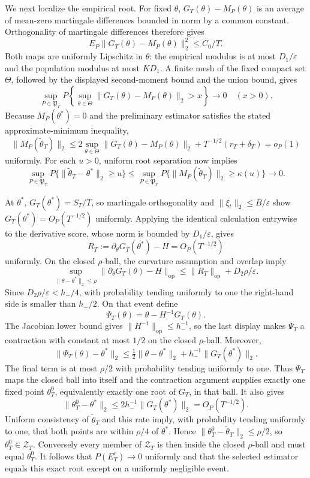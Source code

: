 We next localize the empirical root. For fixed \(\theta\), \(G_T(\theta)-M_P(\theta)\) is an average of mean-zero martingale differences bounded in norm by a common constant. Orthogonality of martingale differences therefore gives
\[
 E_P\|G_T(\theta)-M_P(\theta)\|_2^2\le C_0/T.
\]
Both maps are uniformly Lipschitz in \(\theta\): the empirical modulus is at most \(D_1/\varepsilon\) and the population modulus at most \(KD_1\). A finite mesh of the fixed compact set \(\Theta\), followed by the displayed second-moment bound and the union bound, gives
\[
 \sup_{P\in\mathfrak P_T}P\left\{\sup_{\theta\in\Theta}
 \|G_T(\theta)-M_P(\theta)\|_2>x\right\}\longrightarrow0
 \quad(x>0).
\]
Because \(M_P(\theta^*)=0\) and the preliminary estimator satisfies the stated approximate-minimum inequality,
\[
 \|M_P(\widetilde\theta_T)\|_2
 \le 2\sup_{\theta\in\Theta}\|G_T(\theta)-M_P(\theta)\|_2
     +T^{-1/2}(r_T+\delta_T)=o_P(1)
\]
uniformly. For each \(u>0\), uniform root separation now implies
\[
 \sup_{P\in\mathfrak P_T}P\{\|\widetilde\theta_T-\theta^*\|_2\ge u\}
 \le \sup_{P\in\mathfrak P_T}P\{\|M_P(\widetilde\theta_T)\|_2\ge\kappa(u)\}\to0.
\]

At \(\theta^*\), \(G_T(\theta^*)=S_T/T\), so martingale orthogonality and \(\|\xi_t\|_2\le B/\varepsilon\) show \(G_T(\theta^*)=O_P(T^{-1/2})\) uniformly. Applying the identical calculation entrywise to the derivative score, whose norm is bounded by \(D_1/\varepsilon\), gives
\[
 R_T:=\partial_\theta G_T(\theta^*)-H=O_P(T^{-1/2})
\]
uniformly. On the closed \(\rho\)-ball, the curvature assumption and overlap imply
\[
 \sup_{\|\theta-\theta^*\|_2\le\rho}
 \|\partial_\theta G_T(\theta)-H\|_{\mathrm{op}}
 \le \|R_T\|_{\mathrm{op}}+D_2\rho/\varepsilon.
\]
Since \(D_2\rho/\varepsilon<h_-/4\), with probability tending uniformly to one the right-hand side is smaller than \(h_-/2\). On that event define
\[
 \Psi_T(\theta)=\theta-H^{-1}G_T(\theta).
\]
The Jacobian lower bound gives \(\|H^{-1}\|_{\mathrm{op}}\le h_-^{-1}\), so the last display makes \(\Psi_T\) a contraction with constant at most \(1/2\) on the closed \(\rho\)-ball. Moreover,
\[
 \|\Psi_T(\theta)-\theta^*\|_2
 \le \tfrac12\|\theta-\theta^*\|_2+h_-^{-1}\|G_T(\theta^*)\|_2.
\]
The final term is at most \(\rho/2\) with probability tending uniformly to one. Thus \(\Psi_T\) maps the closed ball into itself and the contraction argument supplies exactly one fixed point \(\theta_T^0\), equivalently exactly one root of \(G_T\), in that ball. It also gives
\[
 \|\theta_T^0-\theta^*\|_2
 \le 2h_-^{-1}\|G_T(\theta^*)\|_2=O_P(T^{-1/2}).
\]
Uniform consistency of \(\widetilde\theta_T\) and this rate imply, with probability tending uniformly to one, that both points are within \(\rho/4\) of \(\theta^*\). Hence \(\|\theta_T^0-\widetilde\theta_T\|_2\le\rho/2\), so \(\theta_T^0\in\mathcal Z_T\). Conversely every member of \(\mathcal Z_T\) is then inside the closed \(\rho\)-ball and must equal \(\theta_T^0\). It follows that \(P(E_T^c)\to0\) uniformly and that the selected estimator equals this exact root except on a uniformly negligible event.

